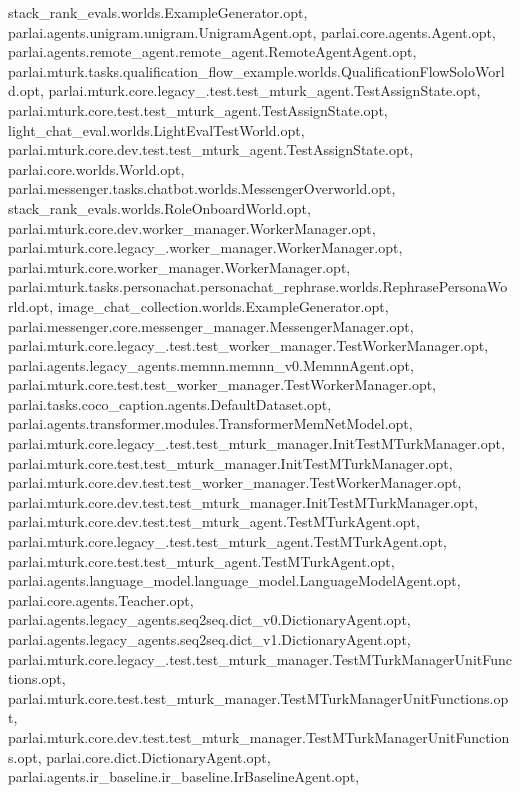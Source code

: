 stack\+\_\+rank\+\_\+evals.\+worlds.\+Example\+Generator.\+opt, parlai.\+agents.\+unigram.\+unigram.\+Unigram\+Agent.\+opt, parlai.\+core.\+agents.\+Agent.\+opt, parlai.\+agents.\+remote\+\_\+agent.\+remote\+\_\+agent.\+Remote\+Agent\+Agent.\+opt, parlai.\+mturk.\+tasks.\+qualification\+\_\+flow\+\_\+example.\+worlds.\+Qualification\+Flow\+Solo\+World.\+opt, parlai.\+mturk.\+core.\+legacy\+\_.\+test.\+test\+\_\+mturk\+\_\+agent.\+Test\+Assign\+State.\+opt, parlai.\+mturk.\+core.\+test.\+test\+\_\+mturk\+\_\+agent.\+Test\+Assign\+State.\+opt, light\+\_\+chat\+\_\+eval.\+worlds.\+Light\+Eval\+Test\+World.\+opt, parlai.\+mturk.\+core.\+dev.\+test.\+test\+\_\+mturk\+\_\+agent.\+Test\+Assign\+State.\+opt, parlai.\+core.\+worlds.\+World.\+opt, parlai.\+messenger.\+tasks.\+chatbot.\+worlds.\+Messenger\+Overworld.\+opt, stack\+\_\+rank\+\_\+evals.\+worlds.\+Role\+Onboard\+World.\+opt, parlai.\+mturk.\+core.\+dev.\+worker\+\_\+manager.\+Worker\+Manager.\+opt, parlai.\+mturk.\+core.\+legacy\+\_.\+worker\+\_\+manager.\+Worker\+Manager.\+opt, parlai.\+mturk.\+core.\+worker\+\_\+manager.\+Worker\+Manager.\+opt, parlai.\+mturk.\+tasks.\+personachat.\+personachat\+\_\+rephrase.\+worlds.\+Rephrase\+Persona\+World.\+opt, image\+\_\+chat\+\_\+collection.\+worlds.\+Example\+Generator.\+opt, parlai.\+messenger.\+core.\+messenger\+\_\+manager.\+Messenger\+Manager.\+opt, parlai.\+mturk.\+core.\+legacy\+\_.\+test.\+test\+\_\+worker\+\_\+manager.\+Test\+Worker\+Manager.\+opt, parlai.\+agents.\+legacy\+\_\+agents.\+memnn.\+memnn\+\_\+v0.\+Memnn\+Agent.\+opt, parlai.\+mturk.\+core.\+test.\+test\+\_\+worker\+\_\+manager.\+Test\+Worker\+Manager.\+opt, parlai.\+tasks.\+coco\+\_\+caption.\+agents.\+Default\+Dataset.\+opt, parlai.\+agents.\+transformer.\+modules.\+Transformer\+Mem\+Net\+Model.\+opt, parlai.\+mturk.\+core.\+legacy\+\_.\+test.\+test\+\_\+mturk\+\_\+manager.\+Init\+Test\+M\+Turk\+Manager.\+opt, parlai.\+mturk.\+core.\+test.\+test\+\_\+mturk\+\_\+manager.\+Init\+Test\+M\+Turk\+Manager.\+opt, parlai.\+mturk.\+core.\+dev.\+test.\+test\+\_\+worker\+\_\+manager.\+Test\+Worker\+Manager.\+opt, parlai.\+mturk.\+core.\+dev.\+test.\+test\+\_\+mturk\+\_\+manager.\+Init\+Test\+M\+Turk\+Manager.\+opt, parlai.\+mturk.\+core.\+dev.\+test.\+test\+\_\+mturk\+\_\+agent.\+Test\+M\+Turk\+Agent.\+opt, parlai.\+mturk.\+core.\+legacy\+\_.\+test.\+test\+\_\+mturk\+\_\+agent.\+Test\+M\+Turk\+Agent.\+opt, parlai.\+mturk.\+core.\+test.\+test\+\_\+mturk\+\_\+agent.\+Test\+M\+Turk\+Agent.\+opt, parlai.\+agents.\+language\+\_\+model.\+language\+\_\+model.\+Language\+Model\+Agent.\+opt, parlai.\+core.\+agents.\+Teacher.\+opt, parlai.\+agents.\+legacy\+\_\+agents.\+seq2seq.\+dict\+\_\+v0.\+Dictionary\+Agent.\+opt, parlai.\+agents.\+legacy\+\_\+agents.\+seq2seq.\+dict\+\_\+v1.\+Dictionary\+Agent.\+opt, parlai.\+mturk.\+core.\+legacy\+\_.\+test.\+test\+\_\+mturk\+\_\+manager.\+Test\+M\+Turk\+Manager\+Unit\+Functions.\+opt, parlai.\+mturk.\+core.\+test.\+test\+\_\+mturk\+\_\+manager.\+Test\+M\+Turk\+Manager\+Unit\+Functions.\+opt, parlai.\+mturk.\+core.\+dev.\+test.\+test\+\_\+mturk\+\_\+manager.\+Test\+M\+Turk\+Manager\+Unit\+Functions.\+opt, parlai.\+core.\+dict.\+Dictionary\+Agent.\+opt, parlai.\+agents.\+ir\+\_\+baseline.\+ir\+\_\+baseline.\+Ir\+Baseline\+Agent.\+opt, 